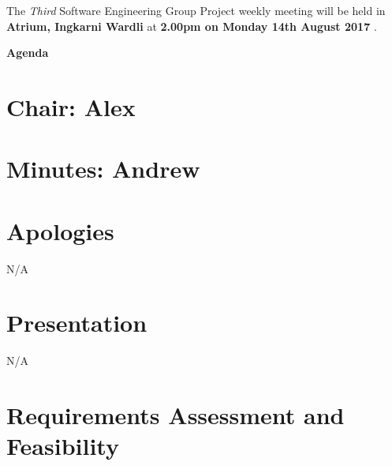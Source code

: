 \documentclass[11pt, a4paper]{article}
\newcommand{\meetingno}{ Third }
\newcommand{\meetinglocation}{ Atrium, Ingkarni Wardli } %
\newcommand{\meetingdatetime}{ 2.00pm on Monday 14th August 2017 } %
\newcommand{\meetingchair}{ Alex } %
\newcommand{\meetingminutes}{ Andrew } %
\begin{document}
  \noindent The {\em \meetingno} Software Engineering Group Project weekly meeting will be held in {\bf \meetinglocation } at {\bf \meetingdatetime }.

  \vspace*{15pt}

  \begin{center}
  \huge \bf Agenda
  \end{center}

  \begin{flushleft}
  
  \section*{Chair: \meetingchair }
  \section*{Minutes: \meetingminutes }
  
  \vspace*{10pt}

  \section{Apologies}
	N/A

  \section{Presentation}
	N/A
  
  \section{Requirements Assessment and Feasibility}
  

\end{flushleft}
\end{document}

